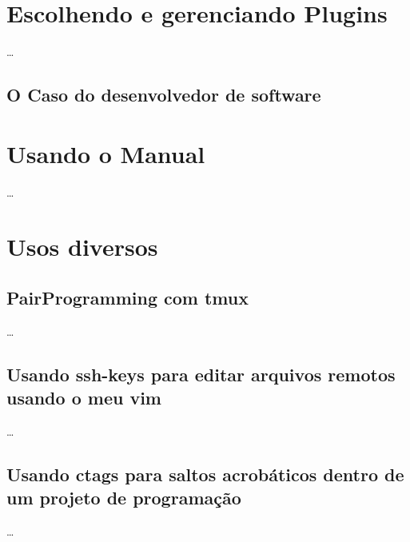 \documentclass[a4paper,12pt,oneside]{book}
\begin{document}





\newcommand{\vimcommand}[1]{%
    \sethlcolor{black}%
    \textbf{\textcolor{white}{\hl{#1}}}%
}
\newcommand{\vimkeys}[1]{%
    \sethlcolor{black}%
    \textbf{\textcolor{red}{\hl{#1}}}%
}
\newcommand{\insertfigure}[3]{
\begin{figure}[!htb]
\centering
\fbox{\texttt{[image: \#2]}}
\caption{#3}
\end{figure}
}












\chapter{Escolhendo e gerenciando Plugins}
\ldots
\section{O Caso do desenvolvedor de software}

\newpage
\chapter{Usando o Manual}
\ldots

\newpage
\chapter{Usos diversos}
\section{PairProgramming com tmux}
\ldots
\section{Usando ssh-keys para editar arquivos remotos usando o meu vim}
\ldots
\section{Usando ctags para saltos acrobáticos dentro de um projeto de programação}
\ldots

\end{document}

